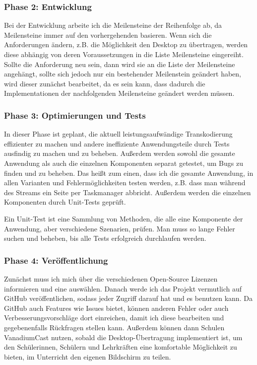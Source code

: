 \documentclass{article}
\begin{document}
    \subsubsection{Phase 2: Entwicklung}\label{subsubsec:phase-2:-entwicklung}

    Bei der Entwicklung arbeite ich die Meilensteine der Reihenfolge ab, da Meilensteine immer auf den vorhergehenden basieren.
    Wenn sich die Anforderungen ändern, z.B. die Möglichkeit den Desktop zu übertragen,
    werden diese abhängig von deren Voraussetzungen in die Liste Meilensteine eingereiht.
    Sollte die Anforderung neu sein, dann wird sie an die Liste der Meilensteine angehängt,
    sollte sich jedoch nur ein bestehender Meilenstein geändert haben, wird dieser zunächst bearbeitet,
    da es sein kann, dass dadurch die Implementationen der nachfolgenden Meilensteine geändert werden müssen.

    \subsubsection{Phase 3: Optimierungen und Tests}\label{subsubsec:phase-3:-optimierungen-und-tests}
    In dieser Phase ist geplant, die aktuell leistungsaufwändige Transkodierung effizienter zu machen
    und andere ineffiziente Anwendungsteile durch Tests ausfindig zu machen und zu beheben.
    Außerdem werden sowohl die gesamte Anwendung als auch die einzelnen Komponenten separat getestet,
    um Bugs zu finden und zu beheben.
    Das heißt zum einen, dass ich die gesamte Anwendung, in allen Varianten und Fehlermöglichkeiten testen werden,
    z.B. dass man während des Streams ein Seite per Taskmanager abbricht.
    Außerdem werden die einzelnen Komponenten durch Unit-Tests geprüft.

    Ein Unit-Test ist eine Sammlung von Methoden, die alle eine Komponente der Anwendung, aber verschiedene Szenarien, prüfen.
    Man muss so lange Fehler suchen und beheben, bis alle Tests erfolgreich durchlaufen werden.

    \subsubsection {Phase 4: Veröffentlichung}\label{subsubsec:phase-4:-veröffentlichung}
    Zunächst muss ich mich über die verschiedenen Open-Source Lizenzen informieren und eine auswählen.
    Danach werde ich das Projekt vermutlich auf GitHub veröffentlichen, sodass jeder Zugriff darauf hat und es benutzen kann.
    Da GitHub auch Features wie Issues bietet, können anderen Fehler oder auch Verbesserungsvorschläge dort einreichen,
    damit ich diese bearbeiten und gegebenenfalls Rückfragen stellen kann.
    Außerdem können dann Schulen VanadiumCast nutzen, sobald die Desktop-Übertragung implementiert ist,
    um den Schülerinnen, Schülern und Lehrkräften eine komfortable Möglichkeit zu bieten,
    im Unterricht den eigenen Bildschirm zu teilen.
\end{document}
